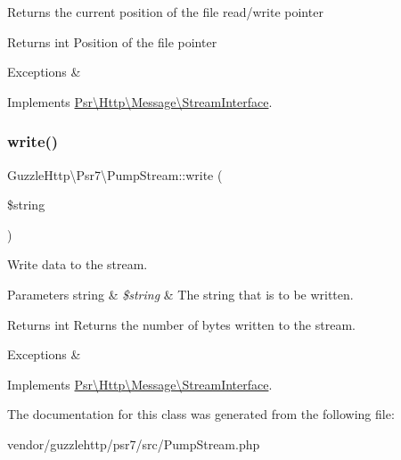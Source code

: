 Returns the current position of the file read/write pointer

\begin{DoxyReturn}{Returns}
int Position of the file pointer 
\end{DoxyReturn}

\begin{DoxyExceptions}{Exceptions}
{\em } & \\
\hline
\end{DoxyExceptions}


Implements \hyperlink{interfacePsr_1_1Http_1_1Message_1_1StreamInterface_a9aa2f88a38f496d74100f42ddf0656ef}{Psr\textbackslash{}\+Http\textbackslash{}\+Message\textbackslash{}\+Stream\+Interface}.

\mbox{\label{classGuzzleHttp_1_1Psr7_1_1PumpStream_a8684ce6b883e9ba97ee9931c580c61fe}} 
\subsubsection{\texorpdfstring{write()}{write()}}
{\footnotesize\ttfamily Guzzle\+Http\textbackslash{}\+Psr7\textbackslash{}\+Pump\+Stream\+::write (\begin{DoxyParamCaption}\item[{}]{\$string }\end{DoxyParamCaption})}

Write data to the stream.


\begin{DoxyParams}[1]{Parameters}
string & {\em \$string} & The string that is to be written. \\
\hline
\end{DoxyParams}
\begin{DoxyReturn}{Returns}
int Returns the number of bytes written to the stream. 
\end{DoxyReturn}

\begin{DoxyExceptions}{Exceptions}
{\em } & \\
\hline
\end{DoxyExceptions}


Implements \hyperlink{interfacePsr_1_1Http_1_1Message_1_1StreamInterface_aabf9fe3e09f85753834cdb69bbdf3c3d}{Psr\textbackslash{}\+Http\textbackslash{}\+Message\textbackslash{}\+Stream\+Interface}.



The documentation for this class was generated from the following file\+:\begin{DoxyCompactItemize}
\item 
vendor/guzzlehttp/psr7/src/Pump\+Stream.\+php\end{DoxyCompactItemize}
